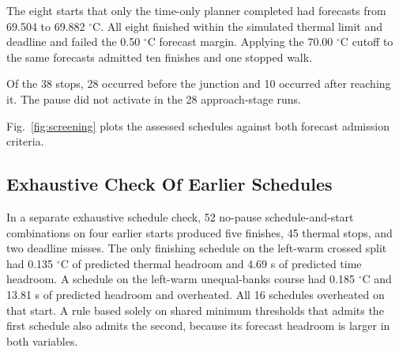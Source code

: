 \documentclass{ieeeaccess}
\begin{document}
The eight starts that only the time-only planner completed had forecasts from 69.504 to 69.882 \ensuremath{{}^{\circ}\mathrm{C}}. All eight finished within the simulated thermal limit and deadline and failed the 0.50 \ensuremath{{}^{\circ}\mathrm{C}} forecast margin. Applying the 70.00 \ensuremath{{}^{\circ}\mathrm{C}} cutoff to the same forecasts admitted ten finishes and one stopped walk.

Of the 38 stops, 28 occurred before the junction and 10 occurred after reaching it. The pause did not activate in the 28 approach-stage runs.

Fig.~\ref{fig:screening} plots the assessed schedules against both forecast admission criteria.

\subsection{Exhaustive Check Of Earlier Schedules}

In a separate exhaustive schedule check, 52 no-pause schedule-and-start combinations on four earlier starts produced five finishes, 45 thermal stops, and two deadline misses. The only finishing schedule on the left-warm crossed split had 0.135 \ensuremath{{}^{\circ}\mathrm{C}} of predicted thermal headroom and 4.69 s of predicted time headroom. A schedule on the left-warm unequal-banks course had 0.185 \ensuremath{{}^{\circ}\mathrm{C}} and 13.81 s of predicted headroom and overheated. All 16 schedules overheated on that start. A rule based solely on shared minimum thresholds that admits the first schedule also admits the second, because its forecast headroom is larger in both variables.
\end{document}
